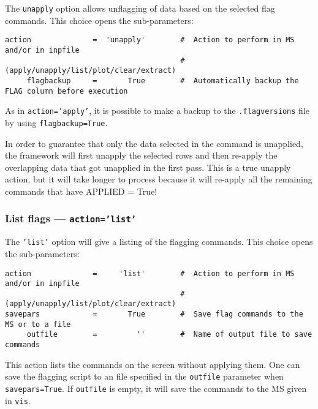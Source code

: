 The {\tt unapply} option allows unflagging of data based on the selected flag commands.
This choice opens the sub-parameters:
\small
\begin{verbatim}
action              =  'unapply'        #  Action to perform in MS and/or in inpfile
                                        #   (apply/unapply/list/plot/clear/extract)
     flagbackup     =       True        #  Automatically backup the FLAG column before execution

\end{verbatim}
\normalsize

As in {\tt action='apply'}, it is possible to make a backup to the
{\tt *.flagversions} file by using {\tt flagbackup=True}.  

In order to guarantee that only the data selected in the command is
unapplied, the framework will first unapply the selected rows and then
re-apply the overlapping data that got unapplied in the first
pass. This is a true unapply action, but it will take longer to
process because it will re-apply all the remaining commands that have
APPLIED = True!


%



\subsubsection{List flags --- {\tt action='list'}}
\label{section:edit.flagcmd.action.list}

The {\tt 'list'} option will give a listing of the flagging commands.
This choice opens the sub-parameters:
\small
\begin{verbatim}
action              =     'list'        #  Action to perform in MS and/or in inpfile
                                        # (apply/unapply/list/plot/clear/extract)
savepars            =       True        #  Save flag commands to the MS or to a file
     outfile        =         ''        #  Name of output file to save commands
\end{verbatim}
\normalsize

This action lists the commands on the screen without applying
them. One can save the flagging script to an file specified in the
{\tt outfile} parameter when {\tt savepars=True}. If {\tt outfile} is
empty, it will save the commands to the MS given in {\tt vis}.



